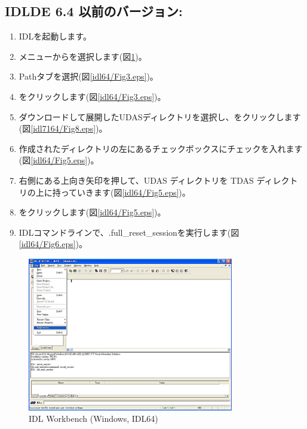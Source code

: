 \documentclass[a4j]{jbook}
\begin{document}
\subsection{IDLDE 6.4  以前のバージョン:}
\begin{enumerate}
\item IDLを起動します。
\item {}メニューからを選択します(図\ref{idl64/Fig2.eps})。
\item Pathタブを選択(図\ref{idl64/Fig3.eps})。
\item {}をクリックします(図\ref{idl64/Fig3.eps})。
\item ダウンロードして展開したUDASディレクトリを選択し、をクリックします(図\ref{idl7164/Fig8.eps})。
\item 作成されたディレクトリの左にあるチェックボックスにチェックを入れます(図\ref{idl64/Fig5.eps})。
\item 右側にある上向き矢印を押して、UDAS ディレクトリを TDAS ディレクトリの上に持っていきます(図\ref{idl64/Fig5.eps})。
\item {}をクリックします(図\ref{idl64/Fig5.eps})。
\item IDLコマンドラインで、.full\_reset\_sessionを実行します(図\ref{idl64/Fig6.eps})。
\end{enumerate}


\begin{figure}[H]
\begin{center}
\includegraphics[width=9cm]{images/fig_idl64/Fig2.eps}
\caption{IDL Workbench (Windows, IDL64)}
\label{idl64/Fig2.eps}
\end{center}
\end{figure}
\end{document}
